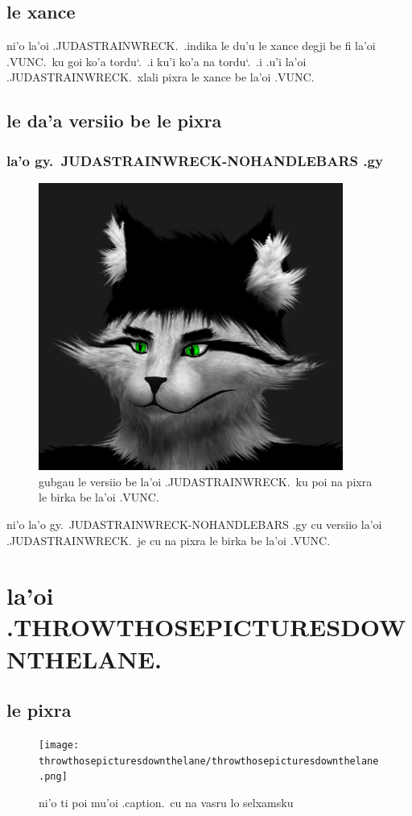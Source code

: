 \documentclass{report}
\newcommand\sds{\spacefactor\sfcode`.\ \space}
\begin{document}
\section{le xance}
ni'o la'oi .JUDASTRAINWRECK.\ .indika le du'u le xance degji be fi la'oi .VUNC.\ ku goi ko'a tordu\sds  .i ku'i ko'a na tordu\sds  .i .u'i la'oi .JUDASTRAINWRECK.\ xlali pixra le xance be la'oi .VUNC.

\section{le da'a versiio be le pixra}

\subsection{la'o gy.\ JUDASTRAINWRECK-NOHANDLEBARS .gy}
\begin{figure}[ht]
	\centering
	\includegraphics[width=10cm]{judastrainwreck/judastrainwreck-nohandlebars.png}
	\caption[center]{gubgau le versiio be la'oi .JUDASTRAINWRECK.\ ku poi na pixra le birka be la'oi .VUNC.}
\end{figure}
ni'o la'o gy.\ JUDASTRAINWRECK-NOHANDLEBARS .gy cu versiio la'oi .JUDASTRAINWRECK.\ je cu na pixra le birka be la'oi .VUNC.

\chapter{la'oi .THROWTHOSEPICTURESDOWNTHELANE.}
\section{le pixra}
\begin{figure}[ht]
	\centering
	\texttt{[image: throwthosepicturesdownthelane/throwthosepicturesdownthelane.png]}
	\caption[center]{ni'o ti poi mu'oi .caption.\ cu na vasru lo selxamsku}
\end{figure}
\end{document}
